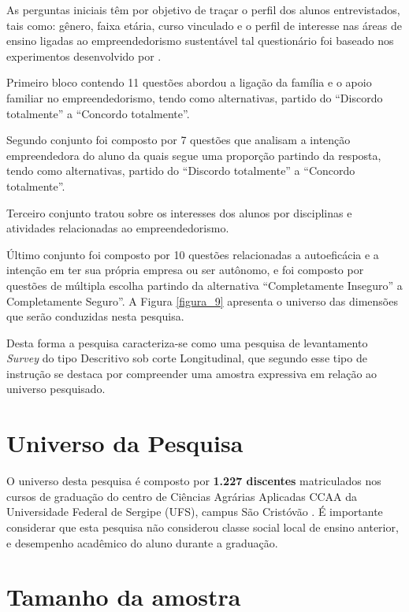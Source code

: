 As perguntas iniciais têm por objetivo de traçar o perfil dos alunos entrevistados, tais como: gênero, faixa etária, curso vinculado e o perfil de interesse nas áreas de ensino ligadas ao empreendedorismo sustentável tal questionário foi baseado nos experimentos desenvolvido por . 


Primeiro bloco contendo 11 questões abordou a ligação da família e o apoio familiar no empreendedorismo, tendo como alternativas, partido do “Discordo totalmente” a “Concordo totalmente”.

Segundo conjunto foi composto por 7 questões que analisam a intenção empreendedora do aluno da quais segue uma proporção partindo da resposta, tendo como alternativas, partido do “Discordo totalmente” a “Concordo totalmente”.

Terceiro conjunto tratou sobre os interesses dos alunos por disciplinas e atividades relacionadas ao empreendedorismo.

Último conjunto foi composto por 10 questões relacionadas a autoeficácia e a intenção em ter sua própria empresa ou ser autônomo, e foi composto por questões de múltipla escolha partindo da alternativa “Completamente Inseguro” a Completamente Seguro”. A Figura \ref{figura_9} apresenta o universo das dimensões que serão conduzidas nesta pesquisa.



Desta forma a pesquisa caracteriza-se como uma pesquisa de levantamento  \textit{Survey} do tipo Descritivo sob corte Longitudinal, que segundo  esse tipo de instrução se destaca por compreender uma amostra expressiva em relação ao universo pesquisado.

\section{Universo da Pesquisa}

O universo desta pesquisa é composto por \textbf{1.227 discentes} matriculados nos cursos de graduação do centro de Ciências Agrárias Aplicadas CCAA da Universidade Federal de Sergipe (UFS), campus São Cristóvão \cite{andrade_ufs_2019}. É importante considerar que esta pesquisa não considerou classe social local de ensino anterior, e desempenho acadêmico do aluno durante a graduação.


\section{Tamanho da amostra}

